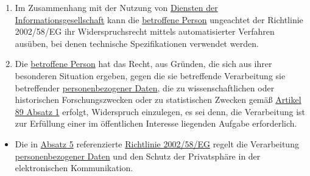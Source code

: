 \begin{enumerate}
  \item Im Zusammenhang mit der Nutzung von \hyperref[itm:04-28]{Diensten der Informationsgesellschaft} kann die \hyperref[itm:04-1]{betroffene Person} ungeachtet
   der Richtlinie 2002/58/EG ihr Widerspruchsrecht mittels automatisierter Verfahren ausüben, bei denen technische
   Spezifikationen verwendet werden.
  \label{itm:21-5}

  \item Die \hyperref[itm:04-1]{betroffene Person} hat das Recht, aus Gründen, die sich aus ihrer besonderen Situation ergeben, gegen die sie
   betreffende Verarbeitung sie betreffender \hyperref[itm:04-1]{personenbezogener Daten}, die zu wissenschaftlichen oder historischen
   Forschungszwecken oder zu statistischen Zwecken gemäß \hyperref[itm:89-1]{Artikel 89 Absatz 1} erfolgt, Widerspruch
   einzulegen, es sei denn, die Verarbeitung ist zur Erfüllung einer im öffentlichen Interesse liegenden Aufgabe
   erforderlich.
  \label{itm:21-6}

\end{enumerate}


\begin{itemize}

  \item Die in \hyperref[itm:21-5]{Absatz 5} referenzierte
   \href{https://eur-lex.europa.eu/legal-content/DE/TXT/HTML/?uri=CELEX:32002L0058&qid=1659212895940&from=DE}
    {Richtlinie 2002/58/EG} regelt die Verarbeitung \hyperref[itm:04-1]{personenbezogener Daten} und den Schutz der Privatsphäre in der
    elektronischen Kommunikation.

\end{itemize}




